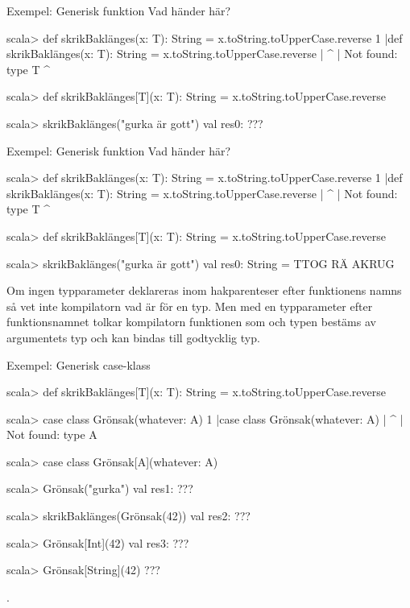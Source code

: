 \begin{Slide}{Exempel: Generisk funktion}
Vad händer här?
\begin{REPL}

scala> def skrikBaklänges(x: T): String = x.toString.toUpperCase.reverse
1 |def skrikBaklänges(x: T): String = x.toString.toUpperCase.reverse
  |                      ^
  |                      Not found: type T
                             ^

scala> def skrikBaklänges[T](x: T): String = x.toString.toUpperCase.reverse

scala> skrikBaklänges("gurka är gott")
val res0: ???
\end{REPL}
\end{Slide}
\fi

\begin{Slide}{Exempel: Generisk funktion}
Vad händer här?
\begin{REPL}

scala> def skrikBaklänges(x: T): String = x.toString.toUpperCase.reverse
1 |def skrikBaklänges(x: T): String = x.toString.toUpperCase.reverse
  |                      ^
  |                      Not found: type T
                             ^

scala> def skrikBaklänges[T](x: T): String = x.toString.toUpperCase.reverse

scala> skrikBaklänges("gurka är gott")
val res0: String = TTOG RÄ AKRUG
\end{REPL}
Om ingen typparameter deklareras inom hakparenteser efter funktionens namns så vet inte kompilatorn vad  är för en typ. Men med en typparameter \code{[T]} efter funktionsnamnet tolkar kompilatorn funktionen som  och typen  bestäms av argumentets typ  och  kan bindas till godtycklig typ.
\end{Slide}


\ifkompendium\else
\begin{Slide}{Exempel: Generisk case-klass}
\vspace{-0.5em}\begin{REPL}
scala> def skrikBaklänges[T](x: T): String = x.toString.toUpperCase.reverse

scala> case class Grönsak(whatever: A)
1 |case class Grönsak(whatever: A)
  |                             ^
  |                             Not found: type A

scala> case class Grönsak[A](whatever: A)

scala> Grönsak("gurka")
val res1: ???

scala> skrikBaklänges(Grönsak(42))
val res2: ???

scala> Grönsak[Int](42)
val res3: ???

scala> Grönsak[String](42)
???



                        .
\end{REPL}
\end{Slide}
\fi

